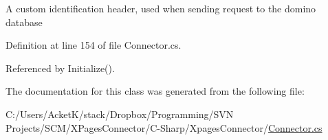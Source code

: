 A custom identification header, used when sending request to the domino database 



Definition at line 154 of file Connector.\+cs.



Referenced by Initialize().



The documentation for this class was generated from the following file\+:\begin{DoxyCompactItemize}
\item 
C\+:/\+Users/\+Acket\+K/stack/\+Dropbox/\+Programming/\+S\+V\+N Projects/\+S\+C\+M/\+X\+Pages\+Connector/\+C-\/\+Sharp/\+Xpages\+Connector/\hyperlink{_connector_8cs}{Connector.\+cs}\end{DoxyCompactItemize}
